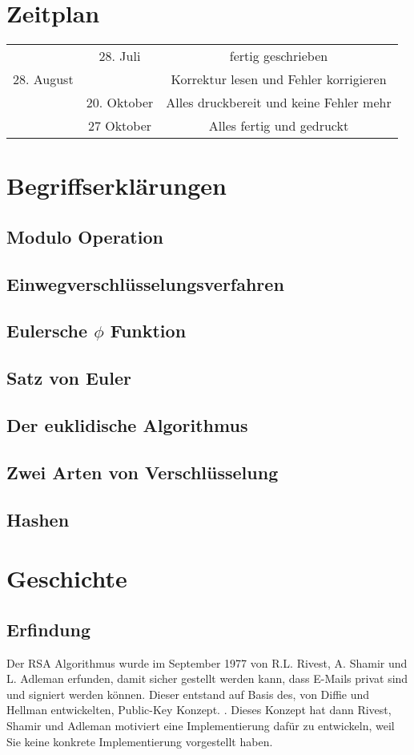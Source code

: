 \documentclass[12pt,a4paper]{scrartcl}
\begin{document}
\section*{Zeitplan}

	\begin{tabular}{ c | c | c }

 & 28. Juli & fertig geschrieben \\
28. August &  & Korrektur lesen und Fehler korrigieren\\
& 20. Oktober & Alles druckbereit und keine Fehler mehr\\
& 27 Oktober & Alles fertig und gedruckt
	\end{tabular}

\section{Begriffserklärungen}
	\subsection{Modulo Operation} %
	\subsection{Einwegverschlüsselungsverfahren}
	\subsection{Eulersche $\phi$ Funktion}
	\subsection{Satz von Euler}
	\subsection{Der euklidische Algorithmus}
	\subsection{Zwei Arten von Verschlüsselung}
	\subsection{Hashen} %

\section{Geschichte}
	\subsection{Erfindung}
	Der RSA Algorithmus wurde im September 1977 von R.L. Rivest, A. Shamir und L. Adleman erfunden, damit sicher gestellt werden kann, dass E-Mails privat sind und signiert werden können. Dieser entstand auf Basis des, von Diffie und Hellman entwickelten, Public-Key Konzept. \cite{1055638}. Dieses Konzept hat dann Rivest, Shamir und Adleman motiviert eine Implementierung dafür zu entwickeln, weil Sie keine konkrete Implementierung vorgestellt haben. \cite[2]{rsaOriginalPaper} 
\end{document}
